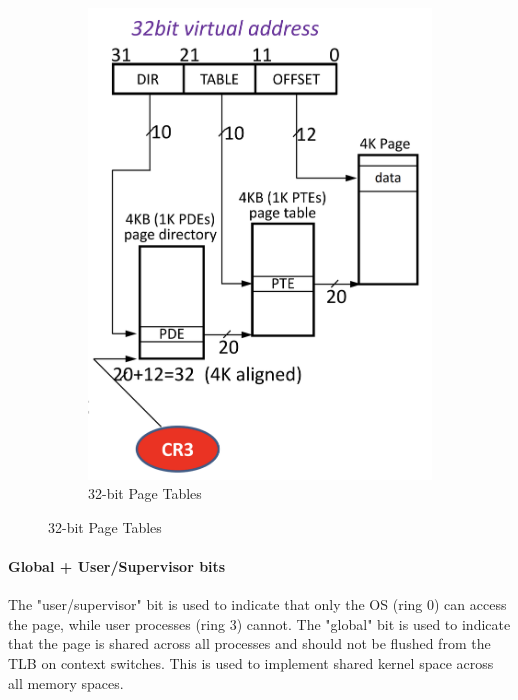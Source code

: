 \documentclass[openany,12pt]{book}
\begin{document}
\begin{figure}[H]
\begin{subfigure}[b]{0.3\textwidth}
        \includegraphics[width=\textwidth]{32bit-virtual.png}
        \caption{32-bit Page Tables}
        \label{fig:32bit-virtual}
    \end{subfigure}
\end{figure}


\paragraph{Global + User/Supervisor bits} The "user/supervisor" bit is used to indicate that only the OS (ring 0) can access the page, while user processes (ring 3) cannot. The "global" bit is used to indicate that the page is shared across all processes and should not be flushed from the TLB on context switches. This is used to implement shared kernel space across all memory spaces. 
\end{document}

